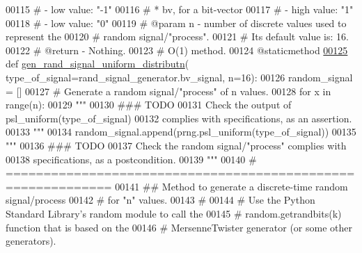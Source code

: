 \begin{DoxyCode}
00115     \textcolor{comment}{#                   - low value: "-1"}
00116     \textcolor{comment}{#               * bv, for a bit-vector}
00117     \textcolor{comment}{#                   - high value: "1"}
00118     \textcolor{comment}{#                   - low value: "0"}
00119     \textcolor{comment}{#   @param n - number of discrete values used to represent the}
00120     \textcolor{comment}{#               random signal/"process".}
00121     \textcolor{comment}{#               Its default value is: 16.}
00122     \textcolor{comment}{#   @return - Nothing.}
00123     \textcolor{comment}{#   O(1) method.}
00124     @staticmethod
\hypertarget{random__process__generator_8py_source_l00125}{}\hyperlink{classrandom__process__models_1_1random__process__generator_1_1rand__signal__generator_a0120f8a5803679907bca0d8267e30781}{00125}     \textcolor{keyword}{def }\hyperlink{classrandom__process__models_1_1random__process__generator_1_1rand__signal__generator_a0120f8a5803679907bca0d8267e30781}{gen\_rand\_signal\_uniform\_distributn}(
      type\_of\_signal=rand\_signal\_generator.bv\_signal, n=16):
00126         random\_signal = []
00127         \textcolor{comment}{# Generate a random signal/"process" of n values.}
00128         \textcolor{keywordflow}{for} x \textcolor{keywordflow}{in} range(n):
00129             \textcolor{stringliteral}{"""}
00130 \textcolor{stringliteral}{                ### TODO}
00131 \textcolor{stringliteral}{                Check the output of psl\_uniform(type\_of\_signal)}
00132 \textcolor{stringliteral}{                    complies with specifications, as an assertion.}
00133 \textcolor{stringliteral}{            """}
00134             random\_signal.append(prng.psl\_uniform(type\_of\_signal))
00135         \textcolor{stringliteral}{"""}
00136 \textcolor{stringliteral}{            ### TODO}
00137 \textcolor{stringliteral}{            Check the random signal/"process" complies with}
00138 \textcolor{stringliteral}{                specifications, as a postcondition.}
00139 \textcolor{stringliteral}{        """}
00140     \textcolor{comment}{# ============================================================}
00141     \textcolor{comment}{##  Method to generate a discrete-time random signal/process}
00142     \textcolor{comment}{#       for "n" values.}
00143     \textcolor{comment}{#}
00144     \textcolor{comment}{#   Use the Python Standard Library's random module to call the}
00145     \textcolor{comment}{#       random.getrandbits(k) function that is based on the}
00146     \textcolor{comment}{#       MersenneTwister generator (or some other generators).}

\end{DoxyCode}
